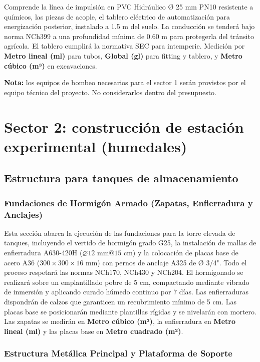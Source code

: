 Comprende la línea de impulsión en PVC Hidráulico Ø 25 mm PN10 resistente a químicos, las piezas de acople, el tablero eléctrico de automatización para energización posterior, instalado a 1.5 m del suelo. La conducción se tenderá bajo norma NCh399 a una profundidad mínima de 0.60 m para protegerla del tránsito agrícola. El tablero cumplirá la normativa SEC para intemperie. Medición por \textbf{Metro lineal (ml)} para tubos, \textbf{Global (gl)} para fitting y tablero, y \textbf{Metro cúbico (m³)} en excavaciones.

\textbf{Nota:} los equipos de bombeo necesarios para el sector 1 serán provistos por el equipo técnico del proyecto. No considerarlos dentro del presupuesto.

\section{Sector 2: construcción de estación experimental (humedales)}

\subsection{Estructura para tanques de almacenamiento}

\subsubsection*{Fundaciones de Hormigón Armado (Zapatas, Enfierradura y Anclajes)}

Esta sección abarca la ejecución de las fundaciones para la torre elevada de tanques, incluyendo el vertido de hormigón grado G25, la instalación de mallas de enfierradura A630-420H (\(\varnothing 12\text{~mm}@15\text{~cm}\)) y la colocación de placas base de acero A36 (\(300 \times 300 \times 16\text{~mm}\)) con pernos de anclaje A325 de Ø 3/4". Todo el proceso respetará las normas NCh170, NCh430 y NCh204. El hormigonado se realizará sobre un emplantillado pobre de 5 cm, compactando mediante vibrado de inmersión y aplicando curado húmedo continuo por 7 días. Las enfierraduras dispondrán de calzos que garanticen un recubrimiento mínimo de 5 cm. Las placas base se posicionarán mediante plantillas rígidas y se nivelarán con mortero. Las zapatas se medirán en \textbf{Metro cúbico (m³)}, la enfierradura en \textbf{Metro lineal (ml)} y las placas base en \textbf{Metro cuadrado (m²)}.

\subsubsection*{Estructura Metálica Principal y Plataforma de Soporte}

